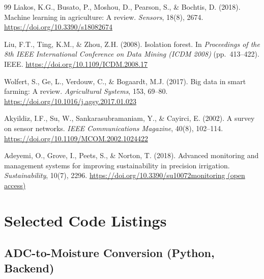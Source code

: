 \documentclass[12pt,a4paper]{report}
\begin{document}
\begin{thebibliography}{99}
Liakos, K.G., Busato, P., Moshou, D., Pearson, S., \& Bochtis, D. (2018).
Machine learning in agriculture: A review.
\textit{Sensors}, 18(8), 2674. \url{https://doi.org/10.3390/s18082674}

Liu, F.T., Ting, K.M., \& Zhou, Z.H. (2008).
Isolation forest.
In \textit{Proceedings of the 8th IEEE International Conference on Data Mining (ICDM 2008)}
(pp.\ 413--422). IEEE. \url{https://doi.org/10.1109/ICDM.2008.17}

Wolfert, S., Ge, L., Verdouw, C., \& Bogaardt, M.J. (2017).
Big data in smart farming: A review.
\textit{Agricultural Systems}, 153, 69--80.
\url{https://doi.org/10.1016/j.agsy.2017.01.023}

Akyildiz, I.F., Su, W., Sankarasubramaniam, Y., \& Cayirci, E. (2002).
A survey on sensor networks.
\textit{IEEE Communications Magazine}, 40(8), 102--114.
\url{https://doi.org/10.1109/MCOM.2002.1024422}

Adeyemi, O., Grove, I., Peets, S., \& Norton, T. (2018).
Advanced monitoring and management systems for improving sustainability in precision irrigation.
\textit{Sustainability}, 10(7), 2296. \url{https://doi.org/10.3390/su10072monitoring (open access)}

\end{thebibliography}

\appendix
\chapter{Selected Code Listings}

\section{ADC-to-Moisture Conversion (Python, Backend)}
\end{document}
